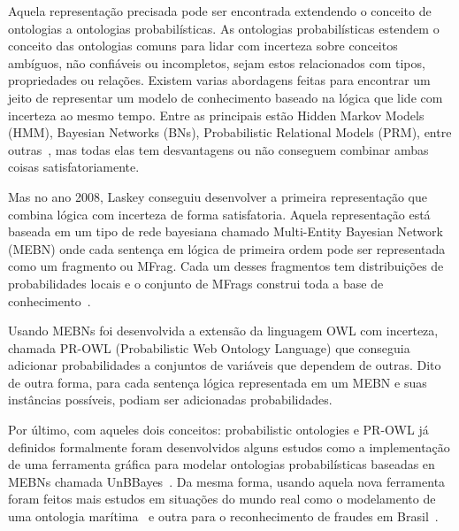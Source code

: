 Aquela representação precisada pode ser encontrada extendendo o conceito de ontologias a ontologias probabilísticas. As ontologias probabilísticas estendem o conceito das ontologias comuns para lidar com incerteza sobre conceitos ambíguos, não confiáveis ou incompletos, sejam estos relacionados com tipos, propriedades ou relações. Existem varias abordagens feitas para encontrar um jeito de representar um modelo de conhecimento baseado na lógica que lide com incerteza ao mesmo tempo. Entre as principais estão Hidden Markov Models (HMM), Bayesian Networks (BNs), Probabilistic Relational Models (PRM), entre outras~\cite{Costa10}, mas todas elas tem desvantagens ou não conseguem combinar ambas coisas satisfatoriamente.

Mas no ano 2008, Laskey conseguiu desenvolver a primeira representação que combina lógica com incerteza de forma satisfatoria. Aquela representação está baseada em um tipo de rede bayesiana chamado Multi-Entity Bayesian Network (MEBN) onde cada sentença em lógica de primeira ordem pode ser representada como um fragmento ou MFrag. Cada um desses fragmentos tem distribuições de probabilidades locais e o conjunto de MFrags construi toda a base de conhecimento~\cite{Laskey08}.

Usando MEBNs foi desenvolvida a extensão da linguagem OWL com incerteza, chamada PR-OWL (Probabilistic Web Ontology Language) que conseguia adicionar probabilidades a conjuntos de variáveis que dependem de outras. Dito de outra forma, para cada sentença lógica representada em um MEBN e suas instâncias possíveis, podiam ser adicionadas probabilidades.

Por último, com aqueles dois conceitos: probabilistic ontologies e PR-OWL já definidos formalmente foram desenvolvidos alguns estudos como a implementação de uma ferramenta gráfica para modelar ontologias probabilísticas baseadas en MEBNs chamada UnBBayes~\cite{UnBBayes08}. Da mesma forma, usando aquela nova ferramenta foram feitos mais estudos em situações do mundo real como o modelamento de uma ontologia marítima~\cite{Laskey11} e outra para o reconhecimento de fraudes em Brasil~\cite{Rommel13}.